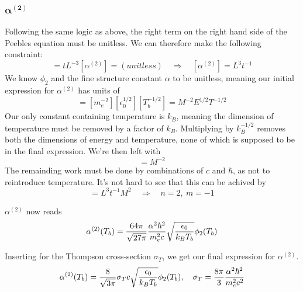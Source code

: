 \documentclass[10pt, a4paper]{article}
\begin{document}
\subsubsection{\texorpdfstring{$\mathbf{\alpha^{(2)}}$}{TEXT} }
Following the same logic as above, the right term on the right hand side of the Peebles equation must be unitless. We can therefore make the following constraint:
\begin{equation*}
    [H^{-1}][n_H][\alpha^{(2)}] = tL^{-3}[\alpha^{(2)}] = (unitless) \quad\Rightarrow\quad [\alpha^{(2)}] = L^3t^{-1}
\end{equation*}
We know $\phi_2$ and the fine structure constant $\alpha$ to be unitless, meaning our initial expression for $\alpha^{(2)}$ has units of
\begin{equation*}
    [\alpha^{(2)}] = [m_e^{-2}][\epsilon_0^{1/2}][T_b^{-1/2}] = M^{-2}E^{1/2}T^{-1/2}
\end{equation*}
Our only constant containing temperature is $k_B$, meaning the dimension of temperature must be removed by a factor of $k_B$. Multiplying by $k_B^{-1/2}$ removes both the dimensions of energy and temperature, none of which is supposed to be in the final expression. We're then left with
\begin{equation*}
    [\alpha^{(2)}][k_B^{1/2}] = M^{-2}
\end{equation*}
The remainding work must be done by combinations of $c$ and $\hbar$, as not to reintroduce temperature. It's not hard to see that this can be achived by
\begin{equation*}
    [\hbar^n][c^m] = L^3t^{-1}M^2  \quad\Rightarrow\quad n=2,\ m=-1
\end{equation*}

$\alpha^{(2)}$ now reads
\begin{equation*}
    \alpha^{(2)}\qty(T_{b}) = \frac{64 \pi}{\sqrt{27 \pi}} \frac{\alpha^{2} \hbar^2}{m_{e}^{2} c} \sqrt{\frac{\epsilon_{0}}{k_B T_{b}}} \phi_{2}\qty(T_{b})
\end{equation*}

Inserting for the Thompson cross-section $\sigma_T$, we get our final expression for $\alpha^{(2)}$.
\begin{equation*}
    \alpha^{(2)}\qty(T_{b}) = \frac{8}{\sqrt{3 \pi}} \sigma_T c \sqrt{\frac{\epsilon_{0}}{k_B T_{b}}} \phi_{2}\qty(T_{b}), \quad \sigma_{T}=\frac{8 \pi}{3} \frac{\alpha^{2} \hbar^{2}}{m_{e}^{2} c^{2}}
\end{equation*}
\end{document}
